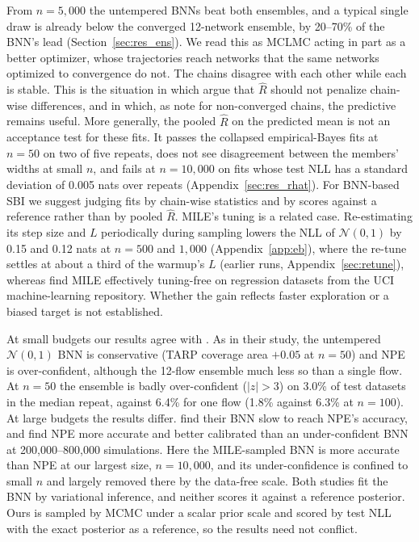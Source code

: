 \documentclass[11pt]{article}
\begin{document}
\label{sec:disc_conv}
From $n=5{,}000$ the untempered BNNs beat both ensembles, and a typical single draw is already below the converged
12-network ensemble, by 20--70\% of the BNN's lead (Section~\ref{sec:res_ens}). We read this as MCLMC acting in part as a
better optimizer, whose trajectories reach networks that the same networks optimized to convergence do not. The chains
disagree with each other while each is stable. This is the situation in which \citet{sommer2024connecting} argue that
$\widehat R$ should not penalize chain-wise differences, and in which, as \citet{papamarkou2022challenges} note for
non-converged chains, the predictive remains useful. More generally, the pooled $\widehat R$ on the predicted mean is not
an acceptance test for these fits. It passes the collapsed empirical-Bayes fits at $n=50$ on two of five repeats, does
not see disagreement between the members' widths at small $n$, and fails at $n=10{,}000$ on fits whose test NLL has a
standard deviation of 0.005 nats over repeats (Appendix~\ref{sec:res_rhat}). For BNN-based SBI we suggest judging fits by
chain-wise statistics and by scores against a reference rather than by pooled $\widehat R$. MILE's tuning is a related
case. Re-estimating its step size and $L$ periodically during sampling lowers the NLL of $\mathcal N(0,1)$ by 0.15 and
0.12 nats at $n=500$ and $1{,}000$ (Appendix~\ref{app:eb}), where the re-tune settles at about a third of the warmup's
$L$ (earlier runs, Appendix~\ref{sec:retune}), whereas \citet{sommer2025mile} find MILE effectively tuning-free on
regression datasets from the UCI machine-learning repository. Whether the gain reflects faster exploration or a biased
target is not established.

\label{sec:disc_lit}
At small budgets our results agree with \citet{delaunoy2024lowbudget}. As in their study, the untempered
$\mathcal N(0,1)$ BNN is conservative (TARP coverage area $+0.05$ at $n=50$) and NPE is over-confident, although the
12-flow ensemble much less so than a single flow. At $n=50$ the ensemble is badly over-confident ($|z|>3$) on 3.0\% of
test datasets in the median repeat, against 6.4\% for one flow (1.8\% against 6.3\% at $n=100$). At large budgets the
results differ. \citet{delaunoy2024lowbudget} find their BNN slow to reach NPE's accuracy, and \citet{poh2025lensing}
find NPE more accurate and better calibrated than an under-confident BNN at 200{,}000--800{,}000 simulations. Here the
MILE-sampled BNN is more accurate than NPE at our largest size, $n=10{,}000$, and its under-confidence is confined to
small $n$ and largely removed there by the data-free scale. Both studies fit the BNN by variational inference, and
neither scores it against a reference posterior. Ours is sampled by MCMC under a scalar prior scale and scored by test
NLL with the exact posterior as a reference, so the results need not conflict.
\end{document}
